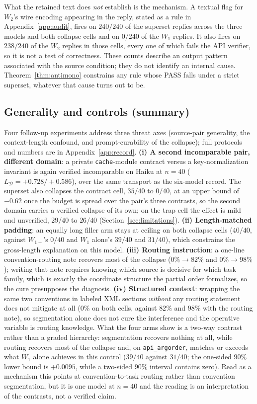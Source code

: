\documentclass[11pt]{article}
\theoremstyle{plain}
\theoremstyle{definition}
\theoremstyle{remark}
\newcommand{\Dcal}{\mathcal{D}}
\begin{document}
What the retained text does \emph{not} establish is the mechanism. A textual flag for $W_2$'s wire
encoding appearing in the reply, stated as a rule in Appendix~\ref{app:audit}, fires on $240/240$
of the superset replies across the three models and both collapse cells and on $0/240$ of the
$W_1$ replies. It also fires on $238/240$ of the $W_2$ replies in those cells, every one of which
fails the API verifier, so it is not a test of correctness. These counts describe an output
pattern associated with the source condition; they do not identify an internal cause.
Theorem~\ref{thm:antimono} constrains any rule whose PASS falls under a strict superset, whatever
that cause turns out to be.
\subsection{Generality and controls (summary)}
\label{sec:results-generality}

Four follow-up experiments address three threat axes (source-pair generality, the context-length
confound, and prompt-curability of the collapse); full protocols and numbers are
in Appendix~\ref{app:record}. \textbf{(i) A second incomparable pair, different domain}: a private
\texttt{cache}-module contract versus a key-normalization invariant is again verified incomparable
on Haiku at $n=40$ ($L_{\Dcal} = +0.728/+0.586$), over the same transport as the six-model
record. The superset also collapses the contract cell, $35/40$ to $0/40$, at an upper bound of
$-0.62$ once the budget is spread over the pair's three contrasts, so the second domain carries a
verified collapse of its own; on the trap cell the effect is mild and unverified, $29/40$ to $26/40$
(Section~\ref{sec:limitations}). \textbf{(ii) Length-matched
padding}: an equally long filler arm stays at ceiling on both collapse cells ($40/40$, against
$W_{1+}$'s $0/40$ and $W_1$ alone's $39/40$ and $31/40$), which constrains the gross-length
explanation on this model.
\textbf{(iii) Routing instruction}: a one-line convention-routing note recovers most of the
collapse ($0\%\to82\%$ and $0\%\to98\%$); writing that note requires knowing which source is
decisive for which task family, which is exactly the coordinate structure the partial order
formalizes, so the cure presupposes the diagnosis. \textbf{(iv) Structured context}: wrapping the
same two conventions in labeled XML sections \emph{without} any routing statement does not
mitigate at all ($0\%$ on both cells, against $82\%$ and $98\%$ with the routing note), so
segmentation alone does not cure the interference and the operative variable is routing
knowledge. What the four arms show is a two-way contrast rather than a graded hierarchy:
segmentation recovers nothing at all, while routing recovers most of the collapse and, on
\texttt{api\_argorder}, matches or exceeds what $W_1$ alone achieves in this control ($39/40$
against $31/40$; the one-sided $90\%$ lower bound is $+0.0095$, while a two-sided $90\%$ interval
contains zero). Read as a mechanism this points at convention-to-task
routing rather than convention segmentation, but it is one model at $n=40$ and the reading is an
interpretation of the contrasts, not a verified claim.
\end{document}
